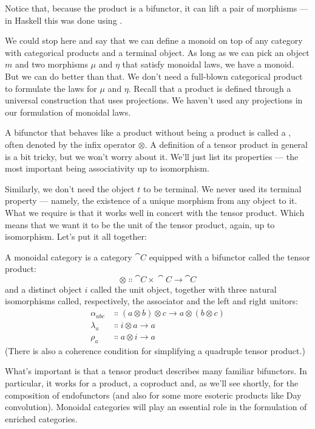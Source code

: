 \noindent
Notice that, because the product is a bifunctor, it can lift a pair of
morphisms --- in Haskell this was done using .

We could stop here and say that we can define a monoid on top of any
category with categorical products and a terminal object. As long as we
can pick an object $m$ and two morphisms $\mu$ and $\eta$ that satisfy
monoidal laws, we have a monoid. But we can do better than that. We
don't need a full-blown categorical product to formulate the laws for $\mu$
and $\eta$. Recall that a product is defined through a universal construction
that uses projections. We haven't used any projections in our
formulation of monoidal laws.

A bifunctor that behaves like a product without being a product is
called a , often denoted by the infix operator $\otimes$. A
definition of a tensor product in general is a bit tricky, but we won't
worry about it. We'll just list its properties --- the most important
being associativity up to isomorphism.

Similarly, we don't need the object $t$ to be terminal. We never
used its terminal property --- namely, the existence of a unique
morphism from any object to it. What we require is that it works well in
concert with the tensor product. Which means that we want it to be the
unit of the tensor product, again, up to isomorphism. Let's put it all
together:

A monoidal category is a category $\cat{C}$ equipped with a bifunctor
called the tensor product:
\[\otimes \Colon \cat{C}\times{}\cat{C} \to \cat{C}\]
and a distinct object $i$ called the unit object, together with
three natural isomorphisms called, respectively, the associator and the
left and right unitors:
\[
	\begin{aligned}
		\alpha_{a b c} & \Colon (a \otimes b) \otimes c \to a \otimes (b \otimes c) \\
		\lambda_a      & \Colon i \otimes a \to a                                   \\
		\rho_a         & \Colon a \otimes i \to a
	\end{aligned}
\]
(There is also a coherence condition for simplifying a quadruple tensor
product.)

What's important is that a tensor product describes many familiar
bifunctors. In particular, it works for a product, a coproduct and, as
we'll see shortly, for the composition of endofunctors (and also for
some more esoteric products like Day convolution). Monoidal categories
will play an essential role in the formulation of enriched categories.


